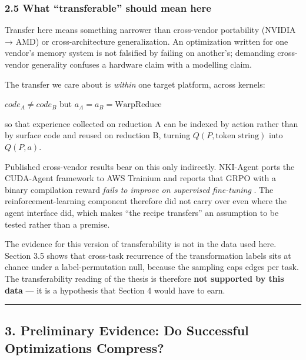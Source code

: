 \documentclass[
  11pt,
]{article}
\begin{document}
\hypertarget{what-transferable-should-mean-here}{%
\subsubsection{2.5 What ``transferable'' should mean here}\label{what-transferable-should-mean-here}}

Transfer here means something narrower than cross-vendor portability (NVIDIA → AMD) or cross-architecture generalization. An optimization written for one vendor's memory system is not falsified by failing on another's; demanding cross-vendor generality confuses a hardware claim with a modelling claim.

The transfer we care about is \emph{within} one target platform, across kernels:

\(\mathit{code}_A \neq \mathit{code}_B\) but \(a_A = a_B = \mathrm{WarpReduce}\)

so that experience collected on reduction A can be indexed by action rather than by surface code and reused on reduction B, turning \(Q(P, \text{token string})\) into \(Q(P, a)\).

Published cross-vendor results bear on this only indirectly. NKI-Agent ports the CUDA-Agent framework to AWS Trainium and reports that GRPO with a binary compilation reward \emph{fails to improve on supervised fine-tuning} \cite{nkiagent18}. The reinforcement-learning component therefore did not carry over even where the agent interface did, which makes ``the recipe transfers'' an assumption to be tested rather than a premise.

The evidence for this version of transferability is not in the data used here. Section 3.5 shows that cross-task recurrence of the transformation labels sits at chance under a label-permutation null, because the sampling caps edges per task. The transferability reading of the thesis is therefore \textbf{not supported by this data} --- it is a hypothesis that Section 4 would have to earn.

\begin{center}\rule{0.5\linewidth}{0.5pt}\end{center}

\hypertarget{preliminary-evidence-do-successful-optimizations-compress}{%
\subsection{3. Preliminary Evidence: Do Successful Optimizations Compress?}\label{preliminary-evidence-do-successful-optimizations-compress}}
\end{document}
